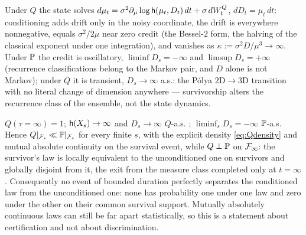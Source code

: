 \begin{theorem}\label{thm:drift}
Under $Q$ the state solves
$d\mu_t=\sigma^2\partial_\mu\log\mathsf{h}(\mu_t,D_t)\,dt+\sigma\,dW^Q_t$,
$dD_t=\mu_t\,dt$: conditioning adds drift only in the noisy
coordinate, the drift is everywhere nonnegative, equals
$\sigma^2/2\mu$ near zero credit (the Bessel-$2$ form, the halving of
the classical exponent under one integration), and vanishes as
$\kappa:=\sigma^2D/\mu^3\to\infty$. Under $\mathbb{P}$ the credit is oscillatory,
$\liminf D_s=-\infty$ and $\limsup D_s=+\infty$ (recurrence
classifications belong to the Markov pair, and $D$ alone is not
Markov); under $Q$ it is transient, $D_s\to\infty$ a.s.: the
P\'olya $2\mathrm D\to3\mathrm D$ transition with no literal change of
dimension anywhere --- survivorship alters the recurrence class of the
ensemble, not the state dynamics.
\end{theorem}

\begin{theorem}
\label{thm:singular}
$Q(\tau=\infty)=1$; $\mathsf{h}(X_s)\to\infty$ and $D_s\to\infty$ $Q$-a.s.
\cite{GJW99}; $\liminf_sD_s=-\infty$ $\mathbb{P}$-a.s. Hence
$Q|_{\mathcal{F}_s}\ll\mathbb{P}|_{\mathcal{F}_s}$ for every finite $s$, with the explicit
density \eqref{eq:Qdensity} and mutual absolute continuity on the
survival event, while $Q\perp\mathbb{P}$ on $\mathcal{F}_\infty$: the survivor's
law is locally equivalent to the unconditioned one on survivors and
globally disjoint from it, the exit from the measure class completed
only at $t=\infty$. Consequently no event of bounded duration perfectly separates the
conditioned law from the unconditioned one: none has probability one
under one law and zero under the other on their common survival
support. Mutually absolutely continuous laws can still be far apart
statistically, so this is a statement about certification and not
about discrimination.
\end{theorem}

